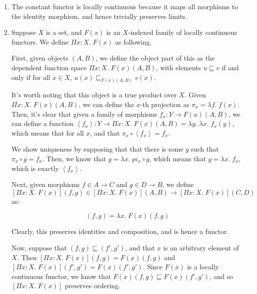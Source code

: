 \documentclass[12pt]{article}
\begin{document}
\begin{enumerate}



% 
% 
% 





\item The constant functor is locally continuous because it maps all 
morphisms to the identity morphism, and hence trivially preserves 
limits. 

\item Suppose $X$ is a set, and $F(x)$ is an $X$-indexed family of
locally continuous functors. We define $\Pi x:X.\; F(x)$ as
following. 

First, given objects $(A,B)$, we define the object part of this as the
dependent function space $\Pi x:X.\; F(x)(A,B)$, with elements $u
\sqsubseteq v$ if and only if for all $x \in X$, $u(x)
\sqsubseteq_{F(x)(A,B)} v(x)$. 

It's worth noting that this object is a true product over $X$. Given
$\Pi x:X.\; F(x)(A,B)$, we can define the $x$-th projection as $\pi_x
= \lambda f.\; f(x)$. Then, it's clear that given a family of 
morphisms $f_x : Y \to F(x)(A,B)$, we can define a function 
$\left<f_x\right> : Y \to \Pi x:X.\;F(x)(A,B) = \lambda y.\; \lambda x.\; f_x(y)$, 
which means that for all $x$, and that $\pi_x \circ \left<f_x\right> = f_x$. 

We show uniqueness by supposing that that there is some $g$ such
that $\pi_x \circ g = f_x$. Then, we know that 
$g = \lambda x.\; pi_x \circ g$, which means that $g = \lambda x.\; f_x$,
which is exactly $\left<f_x\right>$. 


Next, given morphisms $f \in A \to C$ and $g \in D \to B$, we define
$[\Pi x:X.\; F(x)](f,g) \in [\Pi x:X.\; F(x)](A,B) \to [\Pi x:X.\; F(x)](C,D)$
as:
  
\begin{displaymath}
  [\Pi x:X.\; F(x)](f,g) = \lambda x.\; F(x)(f,g)
\end{displaymath}

Clearly, this preserves identities and composition, and is hence a
functor. 

Now, suppose that $(f,g) \sqsubseteq (f',g')$, and that $x$ is an
arbitrary element of $X$. Then $[\Pi x:X.\; F(x)](f,g) = F(x)(f,g)$
and $[\Pi x:X.\; F(x)](f',g') = F(x)(f',g')$. Since $F(x)$ is a
locally continuous functor, we know that $F(x)(f,g) \sqsubseteq
F(x)(f',g')$, and so $[\Pi x:X.\; F(x)]$ preserves ordering.


\end{enumerate}
\end{document}
